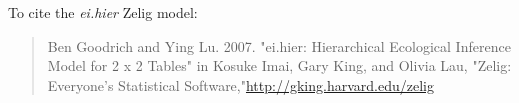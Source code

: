To cite the \emph{ ei.hier } Zelig model:
 \begin{verse}
 Ben Goodrich and Ying Lu. 2007. "ei.hier: Hierarchical Ecological Inference Model for  2 x 2 Tables" in Kosuke Imai, Gary King, and Olivia Lau, "Zelig: Everyone's Statistical Software,"\url{http://gking.harvard.edu/zelig} 
\end{verse}